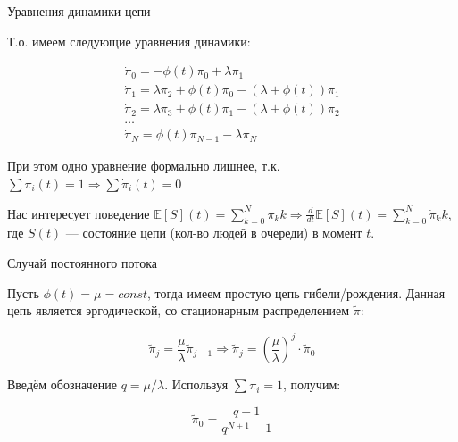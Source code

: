 	\begin{frame}{Уравнения динамики цепи}
		
		Т.о. имеем следующие уравнения динамики:
		
		\begin{gather*}
			\dot{\pi}_0 = - \phi(t) \pi_0 + \lambda \pi_1 \\
			\dot{\pi}_1 = \lambda \pi_2 + \phi(t) \pi_0 - (\lambda + \phi(t)) \pi_1 \\
			\dot{\pi}_2 = \lambda \pi_3 + \phi(t) \pi_1 - (\lambda + \phi(t)) \pi_2 \\
			\ldots \\
			\dot{\pi}_N = \phi(t) \pi_{N-1} - \lambda \pi_N		
		\end{gather*}\label{eq:dinamics}
		
		При этом одно уравнение формально лишнее, т.к. $ \sum \pi_i(t) = 1 \Rightarrow \sum \dot{\pi}_i(t) = 0 $
		
		
		\pause
		
		Нас интересует поведение $ \mathbb{E}[S](t) = \sum\limits_{k = 0}^N \pi_k k \Rightarrow \frac{d}{dt} \mathbb{E}[S](t) = \sum\limits_{k = 0}^N \dot{\pi}_k k $, где $ S(t) $ --- состояние цепи (кол-во людей в очереди) в момент $ t $.
		
	\end{frame}
	
	\begin{frame}{Случай постоянного потока}
		
		Пусть $ \phi(t) = \mu = const $, тогда имеем простую цепь гибели/рождения. Данная цепь является эргодической, со стационарным распределением $ \tilde{\pi} $:
		
		\[
			\tilde{\pi}_j = \frac{\mu}{\lambda} \tilde{\pi}_{j-1} \Rightarrow \tilde{\pi}_j = (\frac{\mu}{\lambda})^j \cdot \tilde{\pi}_0 
		\]
		
		\pause
		
		Введём обозначение $ q = \mu / \lambda $. Используя $ \sum \pi_i = 1 $, получим:
		
		\[
			\tilde{\pi}_0 = \frac{q - 1}{q^{N + 1} - 1}
		\]		
		
	\end{frame}
	
